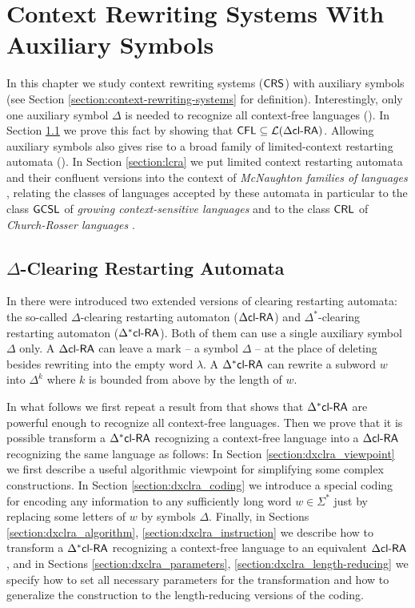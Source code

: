 \chapter{Context Rewriting Systems With Auxiliary Symbols}\label{chapter:crs_aux}

In this chapter we study context rewriting systems ($\textup{\sf CRS\/}$) with auxiliary symbols (see Section \ref{section:context-rewriting-systems} for definition). Interestingly, only one auxiliary symbol $\Delta$ is needed to recognize all context-free languages (\cite{CM11}). In Section \ref{section:dxclra} we prove this fact by showing that $\textup{\sf CFL} \subseteq {\cal L}(\textup{\sf $\Delta$cl-RA\/})$. Allowing auxiliary symbols also gives rise to a broad family of limited-context restarting automata (\cite{B11,OCM13}). In Section \ref{section:lcra} we put limited context restarting automata and their confluent versions into the context of \emph{McNaughton families of languages} \cite{Beaudry2003}, relating the classes of languages accepted by these automata in particular to the class $\textup{\sf GCSL}$ of \emph{growing context-sensitive languages} \cite{Buntrock19981,Dahlhaus1986} and to the class $\textup{\sf CRL}$ of \emph{Church-Rosser languages} \cite{MNO88}.

\section{$\Delta$-Clearing Restarting Automata}\label{section:dxclra}

In \cite{CM10} there were introduced two extended versions of clearing restarting automata: the so-called $\Delta$-clearing restarting automaton ($\textup{\sf $\Delta$cl-RA\/}$) and $\Delta^*$-clearing restarting automaton ($\textup{\sf $\Delta^*$cl-RA\/}$). Both of them can use a single auxiliary symbol $\Delta$ only. A $\textup{\sf $\Delta$cl-RA\/}$ can leave a mark -- a symbol $\Delta$ -- at the place of deleting besides rewriting into the empty word $\lambda$. A $\textup{\sf $\Delta^*$cl-RA\/}$ can rewrite a subword $w$ into $\Delta^k$ where $k$ is bounded from above by the length of $w$. 

In what follows we first repeat a result from \cite{CM10} that shows that $\textup{\sf $\Delta^*$cl-RA\/}$ are powerful enough to recognize  all context-free languages. Then we prove that it is possible transform a $\textup{\sf $\Delta^*$cl-RA\/}$ recognizing a context-free language into a $\textup{\sf $\Delta$cl-RA\/}$ recognizing the same language \cite{CM11} as follows: In Section \ref{section:dxclra_viewpoint} we first describe a useful algorithmic viewpoint for simplifying some complex constructions. In Section \ref{section:dxclra_coding} we introduce a special coding for encoding any information to any sufficiently long word $w \in \Sigma^*$ just by replacing some letters of $w$ by symbols $\Delta$. Finally, in Sections \ref{section:dxclra_algorithm}, \ref{section:dxclra_instruction} we describe how to transform a $\textup{\sf $\Delta^*$cl-RA\/}$ recognizing a context-free language to an equivalent $\textup{\sf $\Delta$cl-RA\/}$, and in Sections \ref{section:dxclra_parameters}, \ref{section:dxclra_length-reducing} we specify how to set all necessary parameters for the transformation and how to generalize the construction to the length-reducing versions of the coding.

